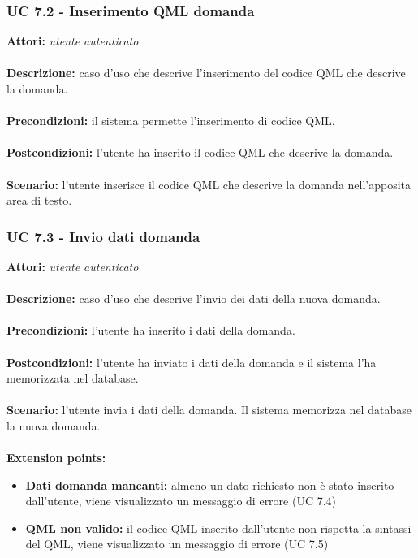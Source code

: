 \documentclass[a4paper,11pt]{article}
\begin{document}
\subsubsection{UC 7.2 - Inserimento QML domanda}

\textbf{Attori:} \textit{utente autenticato}
\\ \\
\textbf{Descrizione:} caso d'uso che descrive l'inserimento del codice QML che descrive la domanda.\\
\\
\textbf{Precondizioni:} il sistema permette l'inserimento di codice QML.\\
\\
\textbf{Postcondizioni:} l’utente ha inserito il codice QML che descrive la domanda.\\
\\
\textbf{Scenario:} l’utente inserisce il codice QML che descrive la domanda nell'apposita area di testo.\\


\subsubsection{UC 7.3 - Invio dati domanda}

\textbf{Attori:} \textit{utente autenticato}
\\ \\
\textbf{Descrizione:} caso d'uso che descrive l'invio dei dati della nuova domanda.\\
\\
\textbf{Precondizioni:} l'utente ha inserito i dati della domanda.\\
\\
\textbf{Postcondizioni:} l’utente ha inviato i dati della domanda e il sistema l'ha memorizzata nel database.\\
\\
\textbf{Scenario:} l’utente invia i dati della domanda. Il sistema memorizza nel database la nuova domanda.\\
\\
\textbf{Extension points:} 
\begin{itemize}
	\item \textbf{Dati domanda mancanti:} almeno un dato richiesto non è stato inserito dall'utente, viene visualizzato un messaggio di errore (UC 7.4)
	\item \textbf{QML non valido:} il codice QML inserito dall'utente non rispetta la sintassi del QML, viene visualizzato un messaggio di errore (UC 7.5)
\end{itemize}
\end{document}
